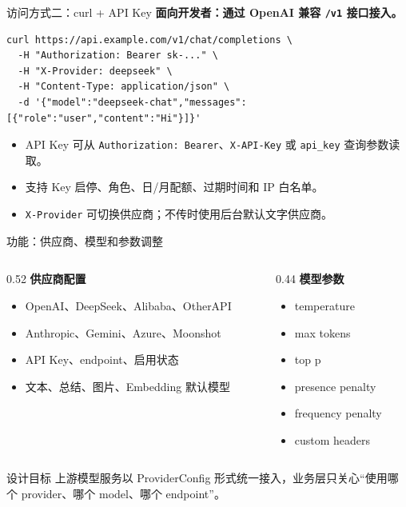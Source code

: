 \documentclass[aspectratio=169,UTF8]{ctexbeamer}
\newcommand{\code}[1]{\texttt{#1}}
\begin{document}
\begin{frame}[fragile]{访问方式二：curl + API Key}
  \textbf{面向开发者：通过 OpenAI 兼容 \code{/v1} 接口接入。}

  \begin{verbatim}
curl https://api.example.com/v1/chat/completions \
  -H "Authorization: Bearer sk-..." \
  -H "X-Provider: deepseek" \
  -H "Content-Type: application/json" \
  -d '{"model":"deepseek-chat","messages":[{"role":"user","content":"Hi"}]}'
  \end{verbatim}

  \begin{itemize}
    \item API Key 可从 \code{Authorization: Bearer}、\code{X-API-Key} 或 \code{api\_key} 查询参数读取。
    \item 支持 Key 启停、角色、日/月配额、过期时间和 IP 白名单。
    \item \code{X-Provider} 可切换供应商；不传时使用后台默认文字供应商。
  \end{itemize}
\end{frame}

\begin{frame}{功能：供应商、模型和参数调整}
  \begin{columns}[T]
    \begin{column}{0.52\linewidth}
      \textbf{供应商配置}
      \begin{itemize}
        \item OpenAI、DeepSeek、Alibaba、OtherAPI
        \item Anthropic、Gemini、Azure、Moonshot
        \item API Key、endpoint、启用状态
        \item 文本、总结、图片、Embedding 默认模型
      \end{itemize}
    \end{column}
    \begin{column}{0.44\linewidth}
      \textbf{模型参数}
      \begin{itemize}
        \item temperature
        \item max tokens
        \item top p
        \item presence penalty
        \item frequency penalty
        \item custom headers
      \end{itemize}
    \end{column}
  \end{columns}

  \vspace{0.25cm}
  \begin{block}{设计目标}
    上游模型服务以 ProviderConfig 形式统一接入，业务层只关心“使用哪个 provider、哪个 model、哪个 endpoint”。
  \end{block}
\end{frame}
\end{document}
